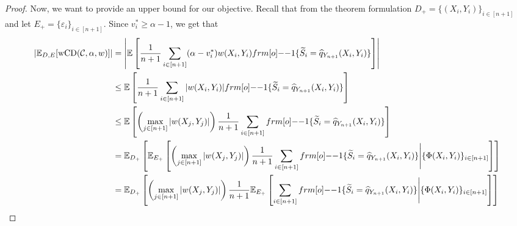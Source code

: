 \begin{proof}
    Now, we want to provide an upper bound for our objective. Recall that from the theorem formulation $D_{+} = \{(X_i,Y_i)\}_{i\in [n+1]}$ and let $E_{+} = \{\varepsilon_i\}_{i \in [n+1]}$. Since $v_i^* \geq \alpha - 1$, we get that 
    \begin{align*}
    |\EE_{D,E}[\wcovdev(\calC, \alpha,w)]| &=
     \left|\EE \left[ \frac{1}{n+1} \sum_{i \in [n+1] } (\alpha -v^*_i)w(X_i,Y_i) \11\{\tS_i = \hat{q}_{Y_{n+1}}(X_i,Y_i)\}\right]\right| \\
     &\leq \EE \left[ \frac{1}{n+1} \sum_{i \in [n+1] }|w(X_i,Y_i)| \11\{\tS_i = \hat{q}_{Y_{n+1}}(X_i,Y_i)\}\right] \\
     &\leq \EE \left[ \left(\max_{j \in [n+1]}|w(X_j,Y_j)|\right)\frac{1}{n+1} \sum_{i \in [n+1] } \11\{\tS_i = \hat{q}_{Y_{n+1}}(X_i,Y_i)\}\right]\\
     &=\EE_{D_{+}}\left[\EE_{E_{+}} \left[ \left(\max_{j \in [n+1]}|w(X_j,Y_j)|\right)\frac{1}{n+1} \sum_{i \in [n+1] } \11\{\tS_i = \hat{q}_{Y_{n+1}}(X_i,Y_i)\}\Bigg|\{\Phi(X_i, Y_i)\}_{i \in [n+1]}\right] \right]\\
     &=\EE_{D_{+}}\left[\left(\max_{j \in [n+1]}|w(X_j,Y_j)|\right)\frac{1}{n+1}\EE_{E_{+}} \left[  \sum_{i \in [n+1] } \11\{\tS_i = \hat{q}_{Y_{n+1}}(X_i,Y_i)\}\Bigg|\{\Phi(X_i, Y_i)\}_{i \in [n+1]}\right] \right]
    \end{align*}
    

\end{proof}
